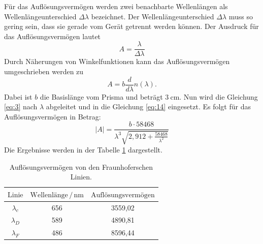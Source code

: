 Für das Auflösungsvermögen werden zwei benachbarte Wellenlängen
als Wellenlängeunterschied $\Delta\lambda$ bezeichnet. Der Wellenlängeunterschied $\Delta\lambda$ muss
so gering sein, dass sie gerade vom Gerät getrennt werden können.
Der Ausdruck für das Auflösungsvermögen lautet
\begin{equation*}
  A = \frac{\lambda}{\Delta\lambda}
\end{equation*}
Durch Näherungen von Winkelfunktionen kann das Auflösungsvermögen umgeschrieben werden zu
\begin{equation}
  A = b \frac{d}{d\lambda} n(\lambda).
  \label{eq:14}
\end{equation}
Dabei ist $b$ die Basislänge vom Prisma und beträgt $\SI{3}{\centi\meter}$.
Nun wird die Gleichung \ref{eq:3} nach $\lambda$ abgeleitet und in die Gleichung \ref{eq:14}
eingesetzt.
Es folgt für das Auflösungsvermögen in Betrag:
\begin{equation}
  |A| = \frac{b\cdot58468}{\lambda^3 \sqrt{2,912 +\frac{58468}{\lambda^2}}}
\end{equation}
Die Ergebnisse werden in der Tabelle \ref{tab:4} dargestellt.
\begin{table}[H]
  \centering
  \caption{Auflösungsvermögen von den Fraunhoferschen Linien.}
  \label{tab:4}
  \begin{tabular}{c c c}
    \toprule
    $\text{Linie}$ & $\text{Wellenlänge} \,/\,\si{\nano\meter}$ & $\text{Auflösungsvermögen}$\\
    \midrule
    $\lambda_c$ & 656 & 3559,02\\
    $\lambda_D$ & 589 & 4890,81\\
    $\lambda_F$ & 486 & 8596,44\\
    \bottomrule
  \end{tabular}
\end{table}

